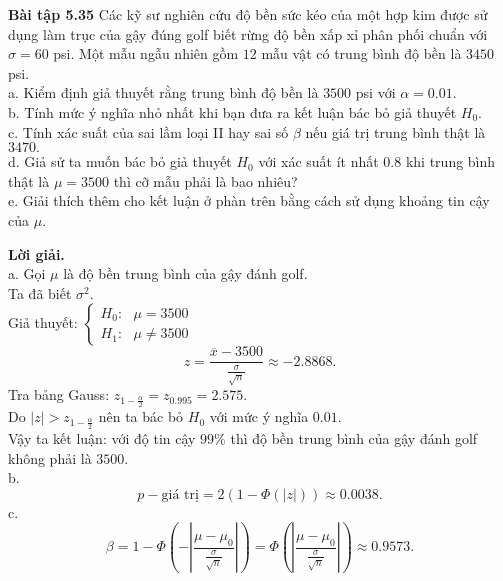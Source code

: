 \begin{mybox}
\textbf{Bài tập 5.35} Các kỹ sư nghiên cứu độ bền sức kéo của một hợp kim được sử dụng làm trục của gậy đúng golf biết rừng độ bền xấp xỉ phân phối chuẩn với $\sigma = 60$ psi. Một mẫu ngẫu nhiên gồm $12$ mẫu vật có trung bình độ bền là $3450$ psi.\\
a. Kiểm định giả thuyết rằng trung bình độ bền là $3500$ psi với $\alpha = 0.01.$\\
b. Tính mức ý nghĩa nhỏ nhất khi bạn đưa ra kết luận bác bỏ giả thuyết $H_0.$\\
c. Tính xác suất của sai lầm loại II hay sai số $\beta$ nếu giá trị trung bình thật là $3470.$\\
d. Giả sử ta muốn bác bỏ giả thuyết $H_0$ với xác suất ít nhất $0.8$ khi trung bình thật là $\mu = 3500$ thì cỡ mẫu phải là bao nhiêu?\\
e. Giải thích thêm cho kết luận ở phàn trên bằng cách sử dụng khoảng tin cậy của $\mu.$
\end{mybox}
\textbf{Lời giải.} \\
a. Gọi $\mu$ là độ bền trung bình của gậy đánh golf.\\
Ta đã biết $\sigma^2.$\\
Giả thuyết: $\begin{cases}
H_0: \text{ } \mu = 3500\\
H_1: \text{ } \mu \ne 3500
\end{cases} $ \\
$$z = \frac{\overline{x} - 3500}{\frac{\sigma}{\sqrt{n}}} \approx -2.8868.$$
Tra bảng Gauss: $z_{1 - \frac{\alpha}{2}}  = z_{0.995} = 2.575.$\\
Do $\left| z \right| > z_{1 - \frac{\alpha}{2}}$ nên ta bác bỏ $H_0$ với mức ý nghĩa $0.01.$\\
Vậy ta kết luận: với độ tin cậy $99\%$ thì độ bền trung bình của gậy đánh golf không phải là $3500.$\\
b. $$p-\text{giá trị} = 2\left( {1 - \Phi \left( {\left| z \right|} \right)} \right) \approx 0.0038.$$
c. $$\beta  = 1 - \Phi \left( { - \left| {\frac{{\mu  - {\mu _0}}}{{\frac{\sigma }{{\sqrt n }}}}} \right|} \right) = \Phi \left( {\left| {\frac{{\mu  - {\mu _0}}}{{\frac{\sigma }{{\sqrt n }}}}} \right|} \right) \approx 0.9573.$$

